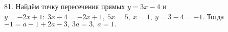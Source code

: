 81. Найдём точку пересечения прямых $y=3x-4$ и $y=-2x+1:\ 3x-4=-2x+1,\ 5x=5,\ x=1,\ y=3-4=-1.$ Тогда $-1=a-1+2a-3,\ 3a=3,\ a=1.$\\
